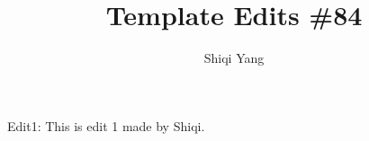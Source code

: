 \documentclass{report}
\title{\Huge{Template Edits \#84}\\}
\author{\huge{Shiqi Yang}}
\date{}
\begin{document}
\maketitle

Edit1: This is edit 1 made by Shiqi.
\end{document}
